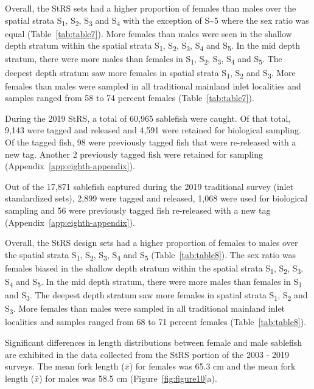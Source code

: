 \documentclass[12pt]{article}\usepackage[]{graphicx}\usepackage[]{color}
\begin{document}
Overall, the StRS sets had a higher proportion of females than males over the spatial strata S\textsubscript{1}, S\textsubscript{2}, S\textsubscript{3} and S\textsubscript{4} with the exception of S\textasciitilde5 where the sex ratio was equal (Table~\ref{tab:table7}). More females than males were seen in the shallow depth stratum within the spatial strata S\textsubscript{1}, S\textsubscript{2}, S\textsubscript{3}, S\textsubscript{4} and S\textsubscript{5}. In the mid depth stratum, there were more males than females in S\textsubscript{1}, S\textsubscript{2}, S\textsubscript{3}, S\textsubscript{4} and S\textsubscript{5}. The deepest depth stratum saw more females in spatial strata S\textsubscript{1}, S\textsubscript{2} and S\textsubscript{3}. More females than males were sampled in all traditional mainland inlet localities and samples ranged from 58 to 74 percent females (Table~\ref{tab:table7}).

During the 2019 StRS, a total of 60,965 sablefish were caught. Of that total, 9,143 were tagged and released and 4,591 were retained for biological sampling. Of the tagged fish, 98 were previously tagged fish that were re-released with a new tag. Another 2 previously tagged fish were retained for sampling (Appendix~\ref{app:eighth-appendix}).

Out of the 17,871 sablefish captured during the 2019 traditional survey (inlet standardized sets), 2,899 were tagged and released, 1,068 were used for biological sampling and 56 were previously tagged fish re-released with a new tag (Appendix~\ref{app:eighth-appendix}).

Overall, the StRS design sets had a higher proportion of females to males over the spatial strata S\textsubscript{1}, S\textsubscript{2}, S\textsubscript{3}, S\textsubscript{4} and S\textsubscript{5} (Table~\ref{tab:table8}). The sex ratio was females biased in the shallow depth stratum within the spatial strata S\textsubscript{1}, S\textsubscript{2}, S\textsubscript{3}, S\textsubscript{4} and S\textsubscript{5}. In the mid depth stratum, there were more males than females in S\textsubscript{1} and S\textsubscript{3}. The deepest depth stratum saw more females in spatial strata S\textsubscript{1}, S\textsubscript{2} and S\textsubscript{3}. More females than males were sampled in all traditional mainland inlet localities and samples ranged from 68 to 71 percent females (Table~\ref{tab:table8}).

Significant differences in length distributions between female and male sablefish are exhibited in the data collected from the StRS portion of the 2003 - 2019 surveys. The mean fork length (\(\bar{x}\)) for females was 65.3 cm and the mean fork length (\(\bar{x}\)) for males was 58.5 cm (Figure~\ref{fig:figure10}a).
\end{document}
